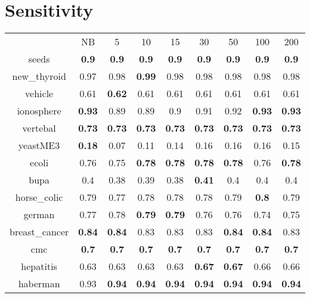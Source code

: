 \documentclass{article}%
\begin{document}
\section*{Sensitivity}%
\begin{tabular}{c|cccccccc}%

&NB&5&10&15&30&50&100&200\\%

seeds&\textbf{0.9}&\textbf{0.9}&\textbf{0.9}&\textbf{0.9}&\textbf{0.9}&\textbf{0.9}&\textbf{0.9}&\textbf{0.9}\\%

new\_thyroid&0.97&0.98&\textbf{0.99}&0.98&0.98&0.98&0.98&0.98\\%

vehicle&0.61&\textbf{0.62}&0.61&0.61&0.61&0.61&0.61&0.61\\%

ionosphere&\textbf{0.93}&0.89&0.89&0.9&0.91&0.92&\textbf{0.93}&\textbf{0.93}\\%

vertebal&\textbf{0.73}&\textbf{0.73}&\textbf{0.73}&\textbf{0.73}&\textbf{0.73}&\textbf{0.73}&\textbf{0.73}&\textbf{0.73}\\%

yeastME3&\textbf{0.18}&0.07&0.11&0.14&0.16&0.16&0.16&0.15\\%

ecoli&0.76&0.75&\textbf{0.78}&\textbf{0.78}&\textbf{0.78}&\textbf{0.78}&0.76&\textbf{0.78}\\%

bupa&0.4&0.38&0.39&0.38&\textbf{0.41}&0.4&0.4&0.4\\%

horse\_colic&0.79&0.77&0.78&0.78&0.78&0.79&\textbf{0.8}&0.79\\%

german&0.77&0.78&\textbf{0.79}&\textbf{0.79}&0.76&0.76&0.74&0.75\\%

breast\_cancer&\textbf{0.84}&\textbf{0.84}&0.83&0.83&0.83&\textbf{0.84}&\textbf{0.84}&0.83\\%

cmc&\textbf{0.7}&\textbf{0.7}&\textbf{0.7}&\textbf{0.7}&\textbf{0.7}&\textbf{0.7}&\textbf{0.7}&\textbf{0.7}\\%

hepatitis&0.63&0.63&0.63&0.63&\textbf{0.67}&\textbf{0.67}&0.66&0.66\\%

haberman&0.93&\textbf{0.94}&\textbf{0.94}&\textbf{0.94}&\textbf{0.94}&\textbf{0.94}&\textbf{0.94}&\textbf{0.94}\\%


\end{tabular}
\end{document}
